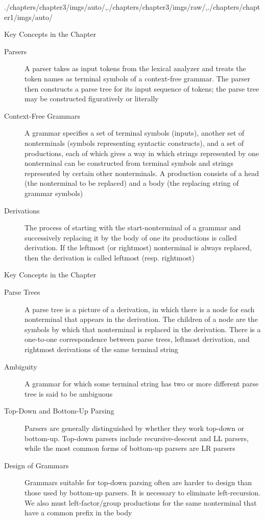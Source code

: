 \begin{graphicspathcontext}{{./chapters/chapter3/imgs/auto/},{./chapters/chapter3/imgs/raw/},{./chapters/chapter1/imgs/auto/}}
\begin{bibunit}[apalike]
\begin{frame}{{Key Concepts} in the Chapter}
	\begin{small}
	\begin{description}
	\item[Parsers] A parser takes as input tokens from the lexical analyzer and treats the token names as terminal symbols of a context-free grammar. The parser then constructs a parse tree for its input sequence of tokens; the parse tree may be constructed figuratively or literally
	\item[Context-Free Grammars] A grammar specifies a set of terminal symbols (inputs), another set of nonterminals (symbols representing syntactic constructs), and a set of productions, each of which gives a way in which strings represented by one nonterminal can be constructed from terminal symbols and strings represented by certain other nonterminals. A production consists of a head (the nonterminal to be replaced) and a body (the replacing string of grammar symbols)
	\item[Derivations] The process of starting with the start-nonterminal of a grammar and successively replacing it by the body of one its productions is called derivation. If the leftmost (or rightmost) nonterminal is always replaced, then the derivation is called leftmost (resp. rightmost)
	\end{description}
\end{small}
\end{frame}

\begin{frame}{{Key Concepts} in the Chapter \insertcontinuationtext}
	\begin{small}
	\begin{description}
	\item[Parse Trees] A parse tree is a picture of a derivation, in which there is a node for each nonterminal that appears in the derivation. The children of a node are the symbols by which that nonterminal is replaced in the derivation. There is a one-to-one correspondence between parse trees, leftmost derivation, and rightmost derivations of the same terminal string
	\item[Ambiguity] A grammar for which some terminal string has two or more different parse tree is said to be ambiguous
	\item[Top-Down and Bottom-Up Parsing] Parsers are generally distinguished by whether they work top-down or bottom-up. Top-down parsers include recursive-descent and LL parsers, while the most common forms of bottom-up parsers are LR parsers
	\item[Design of Grammars] Grammars suitable for top-down parsing often are harder to design than those used by bottom-up parsers. It is necessary to eliminate left-recursion. We also must left-factor/group productions for the same nonterminal that have a common prefix in the body
	\end{description}
\end{small}
\end{frame}


\end{bibunit}
\end{graphicspathcontext}
